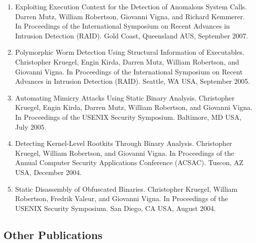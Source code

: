 \documentclass[letterpaper,11pt]{scrartcl}
\begin{document}
\begin{enumerate}
    \item Exploiting Execution Context for the Detection of Anomalous System Calls.
    Darren Mutz, William Robertson, Giovanni Vigna, and Richard Kemmerer.
    In Proceedings of the International Symposium on Recent Advances in Intrusion Detection (RAID).
    Gold Coast, Queensland AUS, September 2007.
    \item Polymorphic Worm Detection Using Structural Information of Executables.
    Christopher Kruegel, Engin Kirda, Darren Mutz, William Robertson, and Giovanni Vigna.
    In Proceedings of the International Symposium on Recent Advances in Intrusion Detection (RAID).
    Seattle, WA USA, September 2005.
    \item Automating Mimicry Attacks Using Static Binary Analysis.
    Christopher Kruegel, Engin Kirda, Darren Mutz, William Robertson, and Giovanni Vigna.
    In Proceedings of the USENIX Security Symposium.
    Baltimore, MD USA, July 2005.
    \item Detecting Kernel-Level Rootkits Through Binary Analysis.
    Christopher Kruegel, William Robertson, and Giovanni Vigna.
    In Proceedings of the Annual Computer Security Applications Conference (ACSAC).
    Tuscon, AZ USA, December 2004.
    \item Static Disassembly of Obfuscated Binaries.
    Christopher Kruegel, William Robertson, Fredrik Valeur, and Giovanni Vigna.
    In Proceedings of the USENIX Security Symposium.
    San Diego, CA USA, August 2004.
\end{enumerate}

\subsection*{Other Publications}
\end{document}

